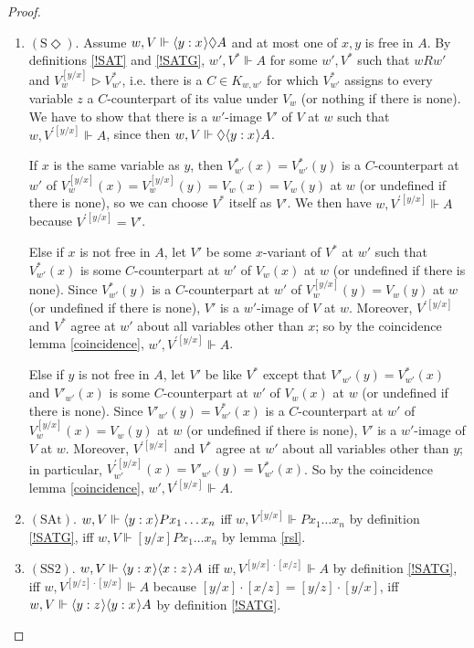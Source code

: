 \documentclass[11pt]{woarticle}
\theoremstyle{break}
\theoremstyle{nonumberplain}
\newcommand{\SAT}{\Vdash}
\newcommand{\Img}{\triangleright}
\newcommand{\1}{\;\,|\;\,}
\renewcommand{\t}[1]{\ensuremath{\langle #1  \makebox[.2ex]{}\rangle}}
\newcommand{\T}[1]{\ensuremath{(\mathrm{ #1})}}
\begin{document}
\begin{proof}
\begin{enumerate}
  \item \T{S\Diamond}.\; Assume $w,V \SAT \t{y:x}\Diamond A$ and at
    most one of $x,y$ is free in $A$. By definitions \ref{!SAT} and
    \ref{!SATG}, $w',V^* \SAT A$ for some $w',V^*$ such that $wRw'$
    and $V_w^{[y/x]} \Img V^*_{w'}$, i.e. there is a $C\in K_{w,w'}$
    for which $V^*_{w'}$ assigns to every variable $z$ a
    $C$-counterpart of its value under $V_w$ (or nothing if there is
    none). We have to show that there is a $w'$-image $V'$ of $V$ at
    $w$ such that $w,V^{\prime [y/x]} \SAT A$, since then $w,V \SAT
    \Diamond \t{y:x}A$.

    If $x$ is the same variable as $y$, then $V^*_{w'}(x) =
    V^*_{w'}(y)$ is a $C$-counterpart at $w'$ of $V^{[y/x]}_w(x) =
    V^{[y/x]}_w(y) = V_w(x) = V_w(y)$ at $w$ (or undefined if there is
    none), so we can choose $V^*$ itself as $V'$. We then have
    $w,V^{\prime[y/x]} \SAT A$ because $V^{\prime[y/x]} = V'$.

    Else if $x$ is not free in $A$, let $V'$ be some $x$-variant of
    $V^*$ at $w'$ such that $V^*_{w'}(x)$ is some $C$-counterpart at
    $w'$ of $V_w(x)$ at $w$ (or undefined if there is none).  Since
    $V^*_{w'}(y)$ is a $C$-counterpart at $w'$ of $V^{[y/x]}_w(y) =
    V_w(y)$ at $w$ (or undefined if there is none), $V'$ is a
    $w'$-image of $V$ at $w$. Moreover, $V^{\prime [y/x]}$ and $V^*$
    agree at $w'$ about all variables other than $x$; so by the
    coincidence lemma \ref{coincidence}, $w',V^{\prime [y/x]} \SAT A$.

    Else if $y$ is not free in $A$, let $V'$ be like $V^*$ except that
    $V'_{w'}(y) = V^*_{w'}(x)$ and $V'_{w'}(x)$ is some $C$-counterpart at
    $w'$ of $V_w(x)$ at $w$ (or undefined if there is none). Since
    $V'_{w'}(y) = V^*_{w'}(x)$ is a $C$-counterpart at $w'$ of
    $V^{[y/x]}_w(x) = V_w(y)$ at $w$ (or undefined if there is none),
    $V'$ is a $w'$-image of $V$ at $w$. Moreover, $V^{\prime [y/x]}$
    and $V^*$ agree at $w'$ about all variables other than $y$; in
    particular, $V^{\prime [y/x]}_{w'}(x) = V'_{w'}(y) =
    V^*_{w'}(x)$. So by the coincidence lemma \ref{coincidence},
    $w',V^{\prime [y/x]} \SAT A$.

  \item \T{SAt}.\; $w,V \SAT \t{y:x}P x_1\ldots x_n$ iff $w,V^{[y/x]}
    \SAT Px_1\ldots x_n$ by definition \ref{!SATG}, iff $w,V \SAT
    [y/x]Px_1\ldots x_n$ by lemma \ref{rsl}.

  \item \T{SS2}.\; $w,V \SAT \t{y:x}\t{x:z} A$ iff $w,V^{[y/x] \cdot
      [x/z]} \SAT A$ by definition \ref{!SATG}, iff $w,V^{[y/z]\cdot
      [y/x]} \SAT A$ because $[y/x]\cdot [x/z] = [y/z]\cdot [y/x]$,
    iff $w,V \SAT \t{y:z} \t{y:x} A$ by definition \ref{!SATG}.


\end{enumerate}
\end{proof}
\end{document}
